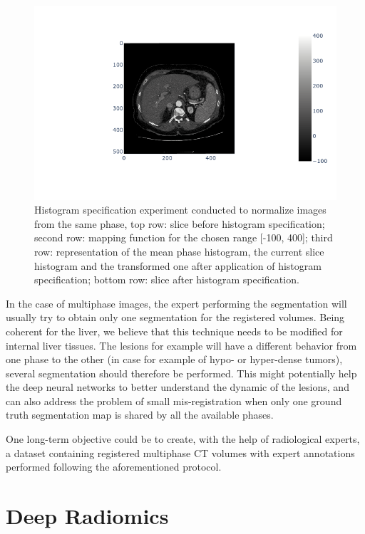 \begin{figure}
\begin{minipage}{0.4\linewidth}
\end{minipage}
\begin{minipage}{0.4\linewidth}
\includegraphics[width=\linewidth]{./images/image4.png}
\end{minipage}
\caption{Histogram specification experiment conducted to normalize images from the same phase, top row: slice before histogram specification; second row: mapping function for the chosen range [-100, 400]; third row: representation of the mean phase histogram, the current slice histogram and the transformed one after application of histogram specification; bottom row: slice after histogram specification.}
\label{fig:specif}
\end{figure}

In the case of multiphase images, the expert performing the segmentation
will usually try to obtain only one segmentation for the registered
volumes. Being coherent for the liver, we believe that this technique
needs to be modified for internal liver tissues. The lesions for example
will have a different behavior from one phase to the other (in case for
example of hypo- or hyper-dense tumors), several segmentation should
therefore be performed. This might potentially help the deep neural
networks to better understand the dynamic of the lesions, and can also
address the problem of small mis-registration when only one ground truth
segmentation map is shared by all the available phases.

One long-term objective could be to create, with the help of
radiological experts, a dataset containing registered multiphase CT
volumes with expert annotations performed following the aforementioned
protocol.

\section{Deep Radiomics}

